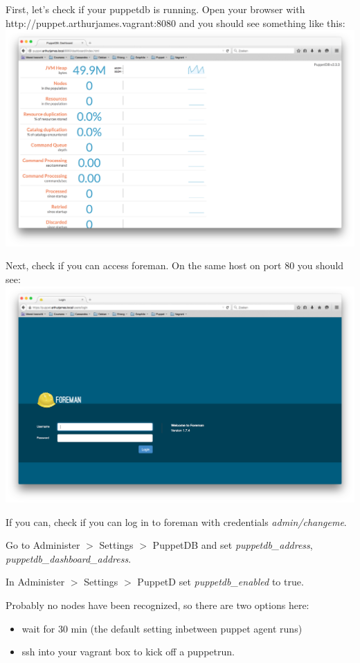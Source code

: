 \documentclass{article}
\begin{document}
\par First, let's check if your puppetdb is running. Open your browser with http://puppet.arthurjames.vagrant:8080 and you should see something like this:\\
\includegraphics[scale=0.3]{images/puppetdb}

\par Next, check if you can access foreman. On the same host on port 80 you should see:\\
\includegraphics[scale=0.3]{images/foreman}

\par If you can, check if you can log in to foreman with credentials \emph{admin/changeme}.

\par Go to Administer $>$ Settings $>$ PuppetDB and set \emph{puppetdb\_address}, \emph{puppetdb\_dashboard\_address}.

\par In Administer $>$ Settings $>$ PuppetD set \emph{puppetdb\_enabled} to true.
\\
\par Probably no nodes have been recognized, so there are two options here:
\begin{itemize}
\item wait for 30 min (the default setting inbetween puppet agent runs)
\item ssh into your vagrant box to kick off a puppetrun.
\end{itemize} 
\end{document}
